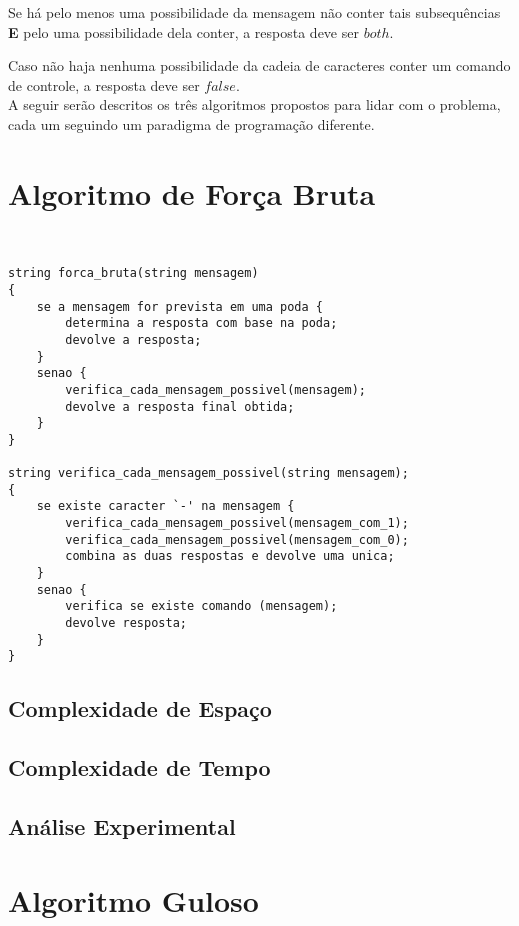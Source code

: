 \documentclass[a4paper,12pt,titlepage]{article}
\begin{document}
Se há pelo menos uma possibilidade da mensagem não conter tais subsequências \textbf{E} pelo uma possibilidade dela conter, a resposta deve ser $both$.

Caso não haja nenhuma possibilidade da cadeia de caracteres conter um comando de controle, a resposta deve ser $false$. \ \\

A seguir serão descritos os três algoritmos propostos para lidar com o problema, cada um seguindo um paradigma de programação diferente.

\section{Algoritmo de Força Bruta}

\ \\ 
\begin{lstlisting}[caption=Algoritmo de Força Bruta]
string forca_bruta(string mensagem)
{
    se a mensagem for prevista em uma poda {
        determina a resposta com base na poda;
        devolve a resposta;
    } 
    senao {
        verifica_cada_mensagem_possivel(mensagem);
        devolve a resposta final obtida;
    }
}

string verifica_cada_mensagem_possivel(string mensagem);
{
    se existe caracter `-' na mensagem {
        verifica_cada_mensagem_possivel(mensagem_com_1);
        verifica_cada_mensagem_possivel(mensagem_com_0);
        combina as duas respostas e devolve uma unica;
    }
    senao {
        verifica se existe comando (mensagem);
        devolve resposta;
    }
}

\end{lstlisting}

\subsection{Complexidade de Espaço}
\subsection{Complexidade de Tempo}
\subsection{Análise Experimental}

\section{Algoritmo Guloso}
\end{document}
